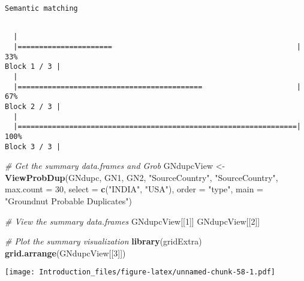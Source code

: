 \documentclass[]{article}
\newenvironment{Shaded}{\begin{snugshade}}{\end{snugshade}}
\newcommand{\CommentTok}[1]{\textcolor[rgb]{0.56,0.35,0.01}{\textit{#1}}}
\newcommand{\DataTypeTok}[1]{\textcolor[rgb]{0.13,0.29,0.53}{#1}}
\newcommand{\DecValTok}[1]{\textcolor[rgb]{0.00,0.00,0.81}{#1}}
\newcommand{\KeywordTok}[1]{\textcolor[rgb]{0.13,0.29,0.53}{\textbf{#1}}}
\newcommand{\NormalTok}[1]{#1}
\newcommand{\StringTok}[1]{\textcolor[rgb]{0.31,0.60,0.02}{#1}}
\begin{document}
\begin{verbatim}
Semantic matching
\end{verbatim}

\begin{verbatim}

  |                                                                       
  |======================                                           |  33%
Block 1 / 3 |
  |                                                                       
  |===========================================                      |  67%
Block 2 / 3 |
  |                                                                       
  |=================================================================| 100%
Block 3 / 3 |
\end{verbatim}

\begin{Shaded}
\begin{Highlighting}[]
\CommentTok{# Get the summary data.frames and Grob}
\NormalTok{GNdupcView <-}\StringTok{ }\KeywordTok{ViewProbDup}\NormalTok{(GNdupc, GN1, GN2, }\StringTok{"SourceCountry"}\NormalTok{, }\StringTok{"SourceCountry"}\NormalTok{,}
                         \DataTypeTok{max.count =} \DecValTok{30}\NormalTok{, }\DataTypeTok{select =} \KeywordTok{c}\NormalTok{(}\StringTok{"INDIA"}\NormalTok{, }\StringTok{"USA"}\NormalTok{), }\DataTypeTok{order =} \StringTok{"type"}\NormalTok{,}
                         \DataTypeTok{main =} \StringTok{"Groundnut Probable Duplicates"}\NormalTok{)}
\end{Highlighting}
\end{Shaded}

\begin{Shaded}
\begin{Highlighting}[]
\CommentTok{# View the summary data.frames}
\NormalTok{GNdupcView[[}\DecValTok{1}\NormalTok{]]}
\NormalTok{GNdupcView[[}\DecValTok{2}\NormalTok{]]}
\end{Highlighting}
\end{Shaded}

\begin{Shaded}
\begin{Highlighting}[]
\CommentTok{# Plot the summary visualization}
\KeywordTok{library}\NormalTok{(gridExtra)}
\KeywordTok{grid.arrange}\NormalTok{(GNdupcView[[}\DecValTok{3}\NormalTok{]])}
\end{Highlighting}
\end{Shaded}

\texttt{[image: Introduction\_files/figure-latex/unnamed-chunk-58-1.pdf]}
\end{document}
